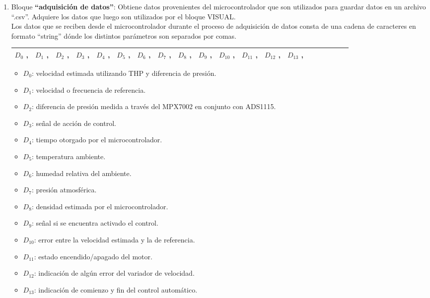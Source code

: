 \begin{enumerate}
\item Bloque \textbf{“adquisición de datos”}: 
\subitem Obtiene datos provenientes del microcontrolador que son utilizados para guardar datos en un archivo “.csv”. 
\subitem Adquiere los datos que luego son utilizados por el bloque VISUAL.\\
 
Los datos que se reciben desde el microcontrolador durante el proceso de adquisición de datos consta de una cadena de caracteres en formato “string” dónde los distintos parámetros son separados por comas.
\begin{table}[h]
	\centering
	\begin{tabular}{|l|l|l|l|l|l|l|l|l|l|l|l|l|l|l|l|l|l|l|l|}
		\hline
		$D_0$ , & $D_1$ , & $D_2$ , & $D_3$ , & $D_4$ , & $D_5$ , & $D_6$ ,  & $D_7$ , & $D_8$ , & $D_9$ , & $D_{10}$ , & $D_{11}$ , & $D_{12}$ , & $D_{13}$ ,  \\ \hline
	\end{tabular}
\end{table}


	\begin{itemize}
	\item $D_0$: velocidad estimada utilizando THP y diferencia de presión.
	\item 	$D_1$: velocidad o frecuencia de referencia.
	\item 	$D_2$: diferencia de presión medida a través del MPX7002 en conjunto con ADS1115.
	\item 	$D_3$: señal de acción de control.
	\item 	$D_4$: tiempo otorgado por el microcontrolador.
	\item 	$D_5$: temperatura ambiente.
	\item 	$D_6$: humedad relativa del ambiente.
	\item 	$D_7$: presión atmosférica.
	\item 	$D_8$: densidad estimada por el microcontrolador.
	\item 	$D_9$: señal si se encuentra activado el control.
	\item 	$D_10$: error entre la velocidad estimada y la de referencia.
	\item 	$D_11$: estado encendido/apagado del motor.
	\item 	$D_12$: indicación de algún error del variador de velocidad.
	\item 	$D_13$: indicación de comienzo y fin del control automático.
	\end{itemize}	



\end{enumerate}
